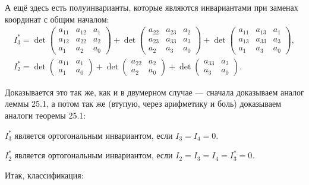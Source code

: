 А ещё здесь есть полуинварианты, которые являются инвариантами при заменах координат с общим началом:
$$
\begin{array}{c}\displaystyle
    I_3^\ast = \det
    \begin{pmatrix}
        a_{11} & a_{12} & a_1\\
        a_{12} & a_{22} & a_2\\
        a_1 & a_2 & a_0
    \end{pmatrix} + \det
    \begin{pmatrix}
        a_{22} & a_{23} & a_2\\
        a_{23} & a_{33} & a_3\\
        a_2 & a_3 & a_0
    \end{pmatrix} + \det
    \begin{pmatrix}
        a_{11} & a_{13} & a_1\\
        a_{13} & a_{33} & a_3\\
        a_1 & a_3 & a_0
    \end{pmatrix},\\\displaystyle I_2^\ast = \det
    \begin{pmatrix}
        a_{11} & a_1\\
        a_1 & a_0
    \end{pmatrix} + \det
    \begin{pmatrix}
        a_{22} & a_2\\
        a_2 & a_0
    \end{pmatrix} + \det
    \begin{pmatrix}
        a_{33} & a_3\\
        a_3 & a_0
    \end{pmatrix}.
\end{array}
$$

Доказывается это так же, как и в двумерном случае --- сначала доказываем аналог леммы 25.1, а потом так же (втупую, через арифметику и боль) доказываем аналоги теоремы 25.1:

\begin{theorem}
    $I_3^\ast$ является ортогональным инвариантом, если $I_3 = I_4 = 0$.
\end{theorem}

\begin{theorem}
    $I_2^\ast$ является ортогональным инвариантом, если $I_2 = I_3 = I_4 = I_3^\ast = 0$.
\end{theorem}

Итак, классификация:


